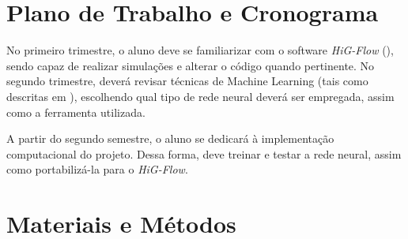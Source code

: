 \documentclass[
	12pt,				%
	oneside,			%
	a4paper,			%
	english,			%
	brazilian,				%
	]{article}
\begin{document}
	\section{Plano de Trabalho e Cronograma}

	No primeiro trimestre, o aluno deve se familiarizar com o software \textit{HiG-Flow} (\cite{Sousa2019,Raymundo2024,Silva2025,HigFlowGitHub}), sendo capaz de realizar simulações e alterar o código quando pertinente. No segundo trimestre, deverá revisar técnicas de Machine Learning (tais como descritas em \cite{Goodfellow-et-al-2016,Braga2007,Haykin1999}), escolhendo qual tipo de rede neural deverá ser empregada, assim como a ferramenta utilizada.

	A partir do segundo semestre, o aluno se dedicará à implementação computacional do projeto. Dessa forma, deve treinar e testar a rede neural, assim como portabilizá-la para o \textit{HiG-Flow}.


	\section{Materiais e Métodos}
\end{document}
